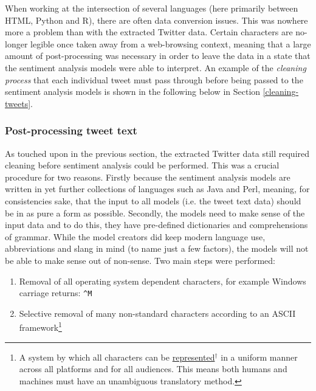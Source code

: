 \documentclass{article}
\begin{document}
When working at the intersection of several languages (here primarily between HTML, Python and R), there are often data conversion issues. This was nowhere more a problem than with the extracted Twitter data. Certain characters are no-longer legible once taken away from a web-browsing context, meaning that a large amount of post-processing was necessary in order to leave the data in a state that the sentiment analysis models were able to interpret. An example of the \emph{cleaning process} that each individual tweet must pass through before being passed to the sentiment analysis models is shown in the following below in Section \ref{cleaning-tweets}.


\subsubsection{Post-processing tweet text \label{cleaning-tweets}}
\label{sec-3-3-5}

As touched upon in the previous section, the extracted Twitter data still required cleaning before sentiment analysis could be performed. This was a crucial procedure for two reasons. Firstly because the sentiment analysis models are written in yet further collections of languages such as Java and Perl, meaning, for consistencies sake, that the input to all models (i.e. the tweet text data) should be in as pure a form as possible. Secondly, the models need to make sense of the input data and to do this, they have pre-defined dictionaries and comprehensions of grammar. While the model creators did keep modern language use, abbreviations and slang in mind (to name just a few factors), the models will not be able to make sense out of non-sense. \newline Two main steps were performed:

\begin{enumerate}
\item Removal of all operating system dependent characters, for example Windows carriage returns: \texttt{\textasciicircum{}M}

\item Selective removal of many non-standard characters according to an ASCII framework\footnote{A system by which all characters can be \href{http://www.asciitable.com/}{represented$^{\dag{}}$} in a uniform manner across all platforms and for all audiences. This means both humans and machines must have an unambiguous translatory method.}
\end{enumerate}
\end{document}
